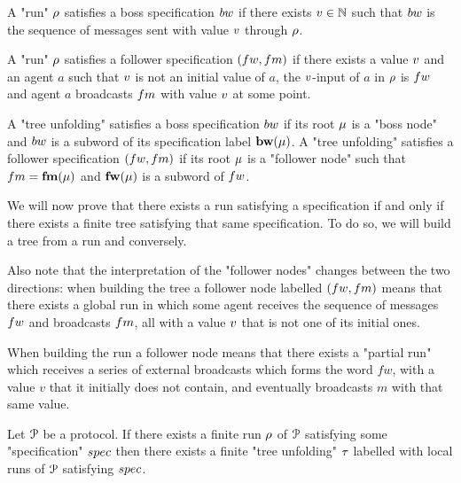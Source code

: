 

\begin{definition}
	A "run" $\rho$ satisfies a boss specification $\bossspec$ if there exists $v \in \mathbb{N}$ such that $\bossspec$ is the sequence of messages sent with value $v$ through $\rho$.
	
	A "run" $\rho$ satisfies a follower specification $(\followwordspec, \followmessagespec)$ if there exists a value $v$ and an agent $a$ such that $v$ is not an initial value of $a$, the $v$-input of $a$ in $\rho$ is $\followwordspec$ and agent $a$ broadcasts $\followmessagespec$ with value $v$ at some point.
	
	A "tree unfolding" satisfies a boss specification $\bossspec$ if its root $\mu$ is a "boss node" and $\bossspec$ is a subword of its specification label $\mathbf{bw}(\mu)$.
	A "tree unfolding" satisfies a follower specification $(\followwordspec, \followmessagespec)$ if its root $\mu$ is a "follower node" such that $\followmessagespec=\followlabelmessage{\node}$ and  $\mathbf{fw}(\mu)$ is a subword of $\followwordspec$.
\end{definition}

We will now prove that there exists a run satisfying a specification if and only if there exists a finite tree satisfying that same specification. To do so, we will build a tree from a run and conversely.


Also note that the interpretation of the "follower nodes" changes between the two directions: when building the tree a follower node labelled $(\followwordspec, \followmessagespec)$ means that there exists a global run in which some agent receives the sequence of messages $\followwordspec$ and broadcasts $\followmessagespec$, all with a value $v$ that is not one of its initial ones.

When building the run a follower node means that there exists a "partial run" which receives a series of external broadcasts which forms the word $fw$, with a value $v$ that it initially does not contain, and eventually broadcasts $m$ with that same value.

\begin{lemma}
	\label{lem:run-to-tree}
	Let $\mathcal{P}$ be a protocol.
	If there exists a finite run $\rho$ of $\mathcal{P}$ satisfying some "specification" $\spec$ then there exists a finite "tree unfolding" $\tau$ labelled with local runs of $\mathcal{P}$ satisfying $\spec$. 
\end{lemma}


